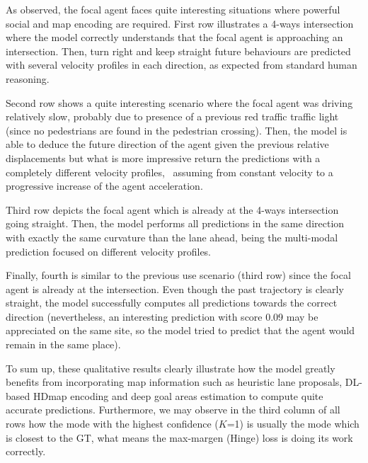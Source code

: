 As observed, the focal agent faces quite interesting situations where powerful social and map encoding are required. First row illustrates a 4-ways intersection where the model correctly understands that the focal agent is approaching an intersection. Then, turn right and keep straight future behaviours are predicted with several velocity profiles in each direction, as expected from standard human reasoning. 

Second row shows a quite interesting scenario where the focal agent was driving relatively slow, probably due to presence of a previous red traffic traffic light (since no pedestrians are found in the pedestrian crossing). Then, the model is able to deduce the future direction of the agent given the previous relative displacements but what is more impressive return the predictions with a completely different velocity profiles, \ie \ assuming from constant velocity to a progressive increase of the agent acceleration.

Third row depicts the focal agent which is already at the 4-ways intersection going straight. Then, the model performs all predictions in the same direction with exactly the same curvature than the lane ahead, being the multi-modal prediction focused on different velocity profiles.

Finally, fourth is similar to the previous use scenario (third row) since the focal agent is already at the intersection. Even though the past trajectory is clearly straight, the model successfully computes all predictions towards the correct direction (nevertheless, an interesting prediction with score 0.09 may be appreciated on the same site, so the model tried to predict that the agent would remain in the same place).

To sum up, these qualitative results clearly illustrate how the model greatly benefits from incorporating map information such as heuristic lane proposals, \ac{DL}-based \ac{HDmap} encoding and deep goal areas estimation to compute quite accurate predictions. Furthermore, we may observe in the third column of all rows how the mode with the highest confidence ($K$=1) is usually the mode which is closest to the \ac{GT}, what means the max-margen (Hinge) loss is doing its work correctly.

